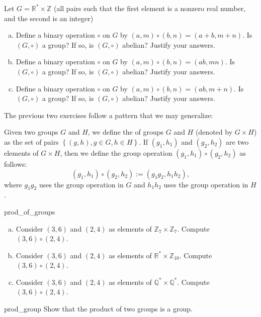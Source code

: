 \begin{exercise}{19}
Let $G = {\mathbb R}^{\ast} \times {\mathbb Z}$ (all pairs such that the first element is a nonzero real number, and the second is an integer) 
\begin{enumerate}[(a)]
\item
Define a binary operation $\circ$ on $G$ by $(a,m) \circ (b,n) = (a+b, m+n)$.  Is $(G , \circ)$ a group?  If so, is $(G , \circ)$ abelian?  Justify your answers.
\item
Define a binary operation $\circ$ on $G$ by $(a,m) \circ (b,n) = (ab, mn)$.  Is $(G , \circ)$ a group?  If so, is $(G , \circ)$ abelian?  Justify your answers.
\item
Define a binary operation $\circ$ on $G$ by $(a,m) \circ (b,n) = (ab, m+n)$.  Is $(G , \circ)$ a group?  If so, is $(G , \circ)$ abelian?  Justify your answers.
\end{enumerate}
\end{exercise}
The previous two exercises follow a pattern that we may generalize:

\begin{defn}\label{def:ProductOfGroups}
Given two groups $G$ and $H$, we define the  of groups $G$ and $H$ (denoted by $G \times H$) as the set of pairs $\left\{(g,h), g \in G, h \in H \right\}$. If $(g_1, h_1)$ and $(g_2,h_2)$ are two elements of $G \times H$, then we define the group operation  $(g_1, h_1) \circ (g_2, h_2)$ as follows: 
\[ (g_1, h_1) \circ (g_2, h_2) := (g_1g_2, h_1h_2),\]
where $g_1g_2$ uses the group operation in $G$ and $h_1h_2$ uses the group operation in $H$.
\end{defn}

\begin{exercise}{prod_of_groups}
\begin{enumerate}[(a)]
\item
Consider $(3,6)$ and $(2,4)$ as elements of ${\mathbb Z}_7 \times {\mathbb Z}_7$. Compute 
$(3,6) \circ (2,4)$.
\item
Consider $(3,6)$ and $(2,4)$ as elements of ${\mathbb R}^{\ast} \times {\mathbb Z}_{10}$. Compute 
$(3,6) \circ (2,4)$.
\item
Consider $(3,6)$ and $(2,4)$ as elements of ${\mathbb Q}^{\ast} \times {\mathbb Q}^{\ast}$. Compute 
$(3,6) \circ (2,4)$.
\end{enumerate}
\end{exercise}

\begin{exercise}{prod_group}
Show that the product of two groups is a group.
\end{exercise}


